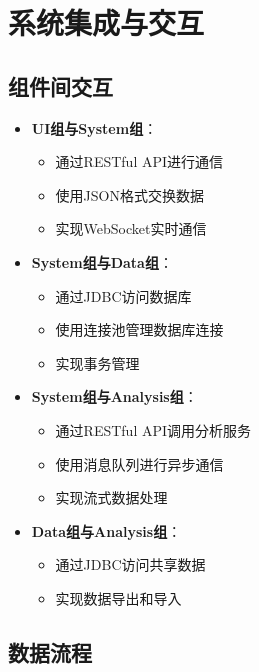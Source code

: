 \documentclass[a4paper,12pt]{article}
\begin{document}
\section{系统集成与交互}

\subsection{组件间交互}

\begin{itemize}
  \item \textbf{UI组与System组}：
    \begin{itemize}
      \item 通过RESTful API进行通信
      \item 使用JSON格式交换数据
      \item 实现WebSocket实时通信
    \end{itemize}
  
  \item \textbf{System组与Data组}：
    \begin{itemize}
      \item 通过JDBC访问数据库
      \item 使用连接池管理数据库连接
      \item 实现事务管理
    \end{itemize}
  
  \item \textbf{System组与Analysis组}：
    \begin{itemize}
      \item 通过RESTful API调用分析服务
      \item 使用消息队列进行异步通信
      \item 实现流式数据处理
    \end{itemize}
  
  \item \textbf{Data组与Analysis组}：
    \begin{itemize}
      \item 通过JDBC访问共享数据
      \item 实现数据导出和导入
    \end{itemize}
\end{itemize}

\subsection{数据流程}
\end{document}
